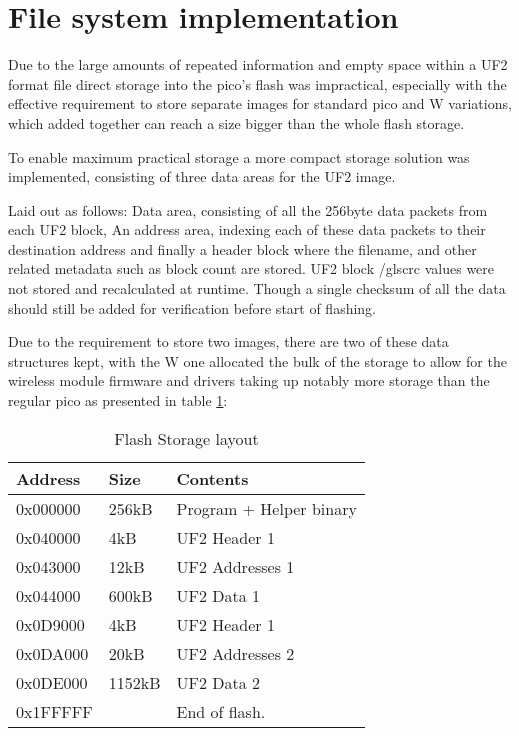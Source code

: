 \clearpage
\section{File system implementation}

Due to the large amounts of repeated information and empty space within a UF2 format file direct storage into the pico's flash was impractical, especially with the effective requirement to store separate images for standard pico and W variations, which added together can reach a size bigger than the whole flash storage.

To enable maximum practical storage a more compact storage solution was implemented, consisting of three data areas for the UF2 image.

Laid out as follows: Data area, consisting of all the 256byte data packets from each UF2 block, An address area, indexing each of these data packets to their destination address and finally a header block where the filename, and other related metadata such as block count are stored. UF2 block /gls{crc} values were not stored and recalculated at runtime. Though a single checksum of all the data should still be added for verification before start of flashing.

Due to the requirement to store two images, there are two of these data structures kept, with the W one allocated the bulk of the storage to allow for the wireless module firmware and drivers taking up notably more storage than the regular pico as presented in table \ref{table:file_storage}:

\begin{table}[h]
	\centering
	\caption{Flash Storage layout}%
	\vspace{-16.5pt}%

		\begin{tabular}{|l|l|l|}
			\hline
			Address & Size  & Contents        \\ \hline
			0x000000 & 256kB & Program + Helper binary \\ \hline
			0x040000 & 4kB & UF2 Header 1      \\ \hline
			0x043000 & 12kB & UF2 Addresses 1 \\ \hline
			0x044000 & 600kB & UF2 Data 1 \\ \hline
			0x0D9000 & 4kB & UF2 Header 1 \\ \hline
			0x0DA000 & 20kB & UF2 Addresses 2      \\ \hline
			0x0DE000 & 1152kB & UF2 Data 2 \\ \hline
			0x1FFFFF & & End of flash. \\ \hline
		\end{tabular}
		\label{table:file_storage}
\end{table}

